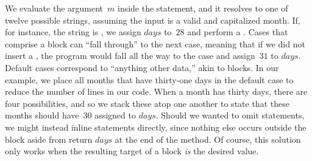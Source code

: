 We evaluate the argument~$m$ inside the  statement, and it resolves to one of twelve possible strings, assuming the input is a valid and capitalized month. 
If, for instance, the string is , we assign $\mathit{days}$ to~$28$ and perform a . 
Cases that comprise a  block can ``fall through'' to the next case, meaning that if we did not insert a , the program would fall all the way to the  case and assign~$31$ to $\mathit{days}$. 
Default cases correspond to ``anything other data,'' akin to  blocks. 
In our example, we place all months that have thirty-one days in the default case to reduce the number of lines in our code. 
When a month has thirty days, there are four possibilities, and so we stack these atop one another to state that these months should have~$30$ assigned to $\mathit{days}$. 
Should we wanted to omit  statements, we might instead inline  statements directly, since nothing else occurs outside the  block aside from return $\mathit{days}$ at the end of the method. 
Of course, this solution only works when the resulting target of a  block \emph{is} the desired value.

